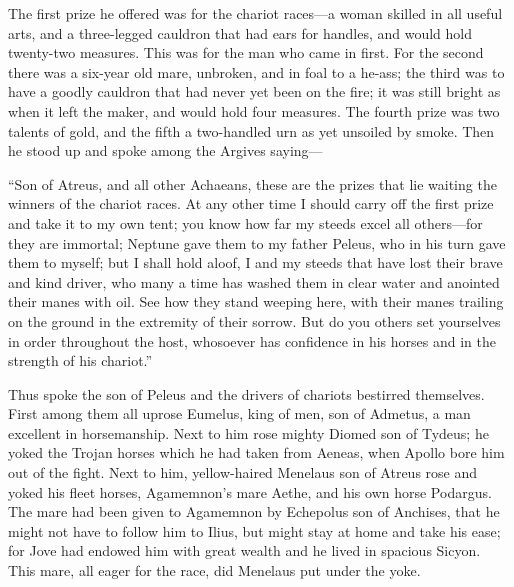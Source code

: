 The first prize he offered was for the chariot races—a woman skilled
in all useful arts, and a three-legged cauldron that had ears for handles,
and would hold twenty-two measures. This was for the man who came in
first. For the second there was a six-year old mare, unbroken, and in foal
to a he-ass; the third was to have a goodly cauldron that had never yet
been on the fire; it was still bright as when it left the maker, and would
hold four measures. The fourth prize was two talents of gold, and the
fifth a two-handled urn as yet unsoiled by smoke. Then he stood up and
spoke among the Argives saying—

“Son of Atreus, and all other Achaeans, these are the prizes that lie
waiting the winners of the chariot races. At any other time I should carry
off the first prize and take it to my own tent; you know how far my steeds
excel all others—for they are immortal; Neptune gave them to my
father Peleus, who in his turn gave them to myself; but I shall hold
aloof, I and my steeds that have lost their brave and kind driver, who
many a time has washed them in clear water and anointed their manes with
oil. See how they stand weeping here, with their manes trailing on the
ground in the extremity of their sorrow. But do you others set yourselves
in order throughout the host, whosoever has confidence in his horses and
in the strength of his chariot.”

Thus spoke the son of Peleus and the drivers of chariots bestirred
themselves. First among them all uprose Eumelus, king of men, son of
Admetus, a man excellent in horsemanship. Next to him rose mighty Diomed
son of Tydeus; he yoked the Trojan horses which he had taken from Aeneas,
when Apollo bore him out of the fight. Next to him, yellow-haired Menelaus
son of Atreus rose and yoked his fleet horses, Agamemnon’s mare Aethe, and
his own horse Podargus. The mare had been given to Agamemnon by Echepolus
son of Anchises, that he might not have to follow him to Ilius, but might
stay at home and take his ease; for Jove had endowed him with great wealth
and he lived in spacious Sicyon. This mare, all eager for the race, did
Menelaus put under the yoke.


